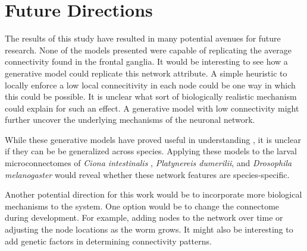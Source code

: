 \section{Future Directions}

The results of this study have resulted in many potential avenues for future research.
None of the models presented were capable of replicating the average connectivity found in the \ce frontal ganglia. 
It would be interesting to see how a generative model could replicate this network attribute.
A simple heuristic to locally enforce a low local connecitivity in each node could be one way in which this could be possible.
It is unclear what sort of biologically realistic mechanism could explain for such an effect.
A generative model with low connectivity might further uncover the underlying mechanisms of the \ce neuronal network.

While these generative models have proved useful in understanding \ce, it is unclear if they can be be generalized across species. 
Applying these models to the larval microconnectomes of \textit{Ciona intestinalis} \citep{Ryan}, \textit{Platynereis dumerilii}\citep{Veraszto}, and \textit{Drosophila melanogaster} \citep{Winding} would reveal whether these network features are species-specific.

Another potential direction for this work would be to incorporate more biological mechanisms to the system.
One option would be to change the connectome during development. 
For example, adding nodes to the network over time or adjusting the node locations as the worm grows. 
It might also be interesting to add genetic factors in determining connectivity patterns. 









